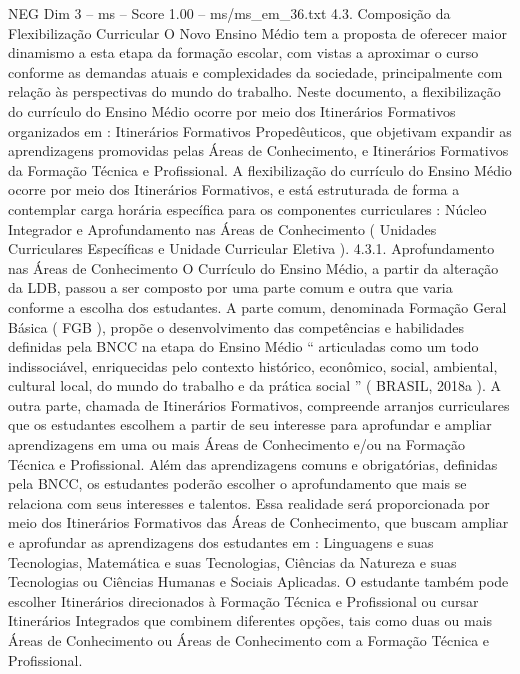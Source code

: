 \begin{textsample}{NEG Dim 3 – ms – Score 1.00 – ms/ms\_em\_36.txt}  \label{ex:f3_neg_095}
4.3.
Composição da Flexibilização Curricular O Novo Ensino Médio tem a proposta de oferecer maior dinamismo a esta etapa da formação escolar, com vistas a aproximar o curso conforme as demandas atuais e complexidades da sociedade, principalmente com relação às perspectivas do mundo do trabalho.
Neste documento, a flexibilização do currículo do Ensino Médio ocorre por meio dos Itinerários Formativos organizados em : Itinerários Formativos Propedêuticos, que objetivam expandir as aprendizagens promovidas pelas Áreas de Conhecimento, e Itinerários Formativos da Formação Técnica e Profissional.
A flexibilização do currículo do Ensino Médio ocorre por meio dos Itinerários Formativos, e está estruturada de forma a contemplar carga horária específica para os componentes curriculares : Núcleo Integrador e Aprofundamento nas Áreas de Conhecimento ( Unidades Curriculares Específicas e Unidade Curricular Eletiva ). 4.3.1.
Aprofundamento nas Áreas de Conhecimento O Currículo do Ensino Médio, a partir da alteração da LDB, passou a ser composto por uma parte comum e outra que varia conforme a escolha dos estudantes.
A parte comum, denominada Formação Geral Básica ( FGB ), propõe o desenvolvimento das competências e habilidades definidas pela BNCC na etapa do Ensino Médio “ articuladas como um todo indissociável, enriquecidas pelo contexto histórico, econômico, social, ambiental, cultural local, do mundo do trabalho e da prática social ” ( BRASIL, 2018a ).
A outra parte, chamada de Itinerários Formativos, compreende arranjos curriculares que os estudantes escolhem a partir de seu interesse para aprofundar e ampliar aprendizagens em uma ou mais Áreas de Conhecimento e/ou na Formação Técnica e Profissional.
Além das aprendizagens comuns e obrigatórias, definidas pela BNCC, os estudantes poderão escolher o aprofundamento que mais se relaciona com seus interesses e talentos.
Essa realidade será proporcionada por meio dos Itinerários Formativos das Áreas de Conhecimento, que buscam ampliar e aprofundar as aprendizagens dos estudantes em : Linguagens e suas Tecnologias, Matemática e suas Tecnologias, Ciências da Natureza e suas Tecnologias ou Ciências Humanas e Sociais Aplicadas.
O estudante também pode escolher Itinerários direcionados à Formação Técnica e Profissional ou cursar Itinerários Integrados que combinem diferentes opções, tais como duas ou mais Áreas de Conhecimento ou Áreas de Conhecimento com a Formação Técnica e Profissional.

\end{textsample}
